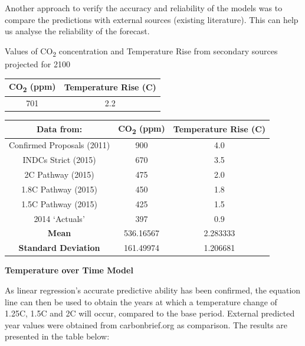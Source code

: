 \documentclass[12pt]{mcmthesis}
\begin{document}
    Another approach to verify the accuracy and reliability of the models was to compare the predictions with external sources (existing literature). This can help us analyse the reliability of the forecast.

    Values of CO\textsubscript{2} concentration and Temperature Rise from secondary sources projected for 2100

    \begin{center}
        \begin{tabular}{ |c|c|}
            \hline
            \textbf{CO\textsubscript{2} (ppm)} & \textbf{Temperature Rise (C)} \\
            \hline
            701 & 2.2 \\
            \hline
        \end{tabular}
    \end{center}

    \begin{center}
        \begin{tabular}{ |c|c|c|}
            \hline
            Data from: & \textbf{CO\textsubscript{2} (ppm)} & \textbf{Temperature Rise (C)} \\
            \hline
            Confirmed Proposals (2011) & 900 & 4.0 \\
            \hline
            INDCs Strict (2015) & 670 & 3.5 \\ \hline
            2C Pathway (2015) & 475 & 2.0 \\ \hline
            1.8C Pathway (2015) & 450 & 1.8 \\ \hline
            1.5C Pathway (2015) & 425 & 1.5 \\ \hline
            2014 `Actuals' & 397 & 0.9 \\ \hline
            \textbf{Mean} & 536.16567 & 2.283333 \\ \hline
            \textbf{Standard Deviation} & 161.49974 & 1.206681 \\ \hline
        \end{tabular}
    \end{center}


    \noindent\textbf{Temperature over Time Model}

    As linear regression’s accurate predictive ability has been confirmed, the equation line can then be used to obtain the years at which a temperature change of 1.25C, 1.5C and 2C will occur, compared to the base period. External predicted year values were obtained from carbonbrief.org as comparison. The results are presented in the table below:
\end{document}
